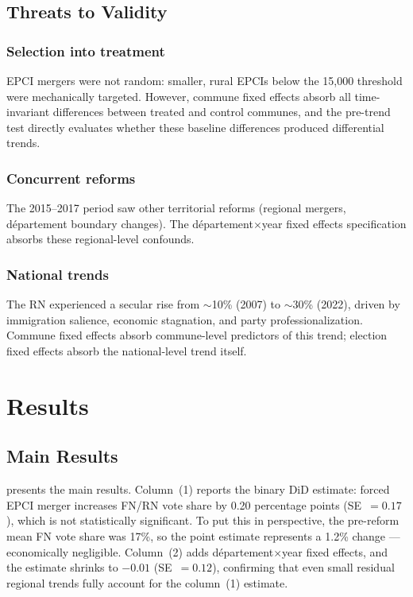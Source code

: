 \documentclass[12pt]{article}
\begin{document}
\subsection{Threats to Validity}

\subsubsection*{Selection into treatment} EPCI mergers were not random: smaller, rural EPCIs below the 15,000 threshold were mechanically targeted. However, commune fixed effects absorb all time-invariant differences between treated and control communes, and the pre-trend test directly evaluates whether these baseline differences produced differential trends.

\subsubsection*{Concurrent reforms} The 2015--2017 period saw other territorial reforms (regional mergers, d\'{e}partement boundary changes). The d\'{e}partement$\times$year fixed effects specification absorbs these regional-level confounds.

\subsubsection*{National trends} The RN experienced a secular rise from $\sim$10\% (2007) to $\sim$30\% (2022), driven by immigration salience, economic stagnation, and party professionalization. Commune fixed effects absorb commune-level predictors of this trend; election fixed effects absorb the national-level trend itself.

\section{Results}

\subsection{Main Results}



 presents the main results. Column~(1) reports the binary DiD estimate: forced EPCI merger increases FN/RN vote share by 0.20 percentage points (SE~$= 0.17$), which is not statistically significant. To put this in perspective, the pre-reform mean FN vote share was 17\%, so the point estimate represents a 1.2\% change --- economically negligible. Column~(2) adds d\'{e}partement$\times$year fixed effects, and the estimate shrinks to $-0.01$ (SE~$= 0.12$), confirming that even small residual regional trends fully account for the column~(1) estimate.
\end{document}
